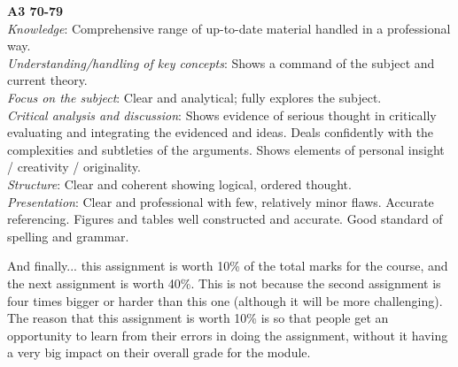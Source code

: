 \documentclass[11pt,]{article}
\begin{document}
{\bf A3 70-79}\\
\emph{Knowledge}: Comprehensive range of up-to-date material handled in a professional way.\\
\emph{Understanding/handling of key concepts}: Shows a command of the subject and current theory.\\
\emph{Focus on the subject}: Clear and analytical; fully explores the subject.\\
\emph{Critical analysis and discussion}: Shows evidence of serious thought in critically evaluating and integrating the evidenced and ideas. Deals confidently with the complexities and subtleties of the arguments. Shows elements of personal insight / creativity / originality.\\
\emph{Structure}: Clear and coherent showing logical, ordered thought.\\
\emph{Presentation}: Clear and professional with few, relatively minor flaws. Accurate referencing. Figures and tables well constructed and accurate. Good standard of spelling and grammar.


\bigskip
And finally...  this assignment is worth 10\% of the total marks for the course, and the next assignment is worth 40\%.  This is not because the second assignment is four times bigger or harder than this one (although it will be more challenging).  The reason that this assignment is worth 10\% is so that people get an opportunity to learn from their errors in doing the assignment, without it having a very big impact on their overall grade for the module. 





\end{document}
